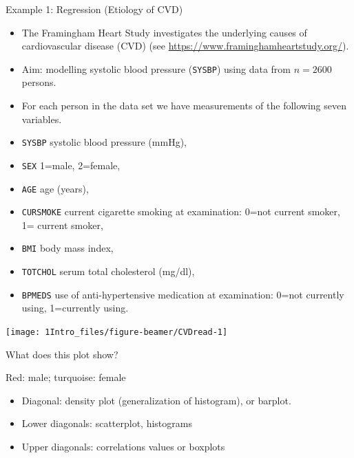 \documentclass[10pt,ignorenonframetext,]{beamer}
\providecommand{\tightlist}{%
  \setlength{\itemsep}{0pt}\setlength{\parskip}{0pt}}
\begin{document}
\begin{frame}[fragile]{Example 1: Regression (Etiology of CVD)}

\begin{itemize}
\item
  The Framingham Heart Study investigates the underlying causes of
  cardiovascular disease (CVD) (see
  \url{https://www.framinghamheartstudy.org/}). 
\item
  Aim: modelling systolic blood pressure (\texttt{SYSBP}) using data
  from \(n=2600\) persons.
\item
  For each person in the data set we have measurements of the following
  seven variables.
\end{itemize}

\scriptsize

\begin{itemize}
\tightlist
\item
  \texttt{SYSBP} systolic blood pressure (mmHg),
\item
  \texttt{SEX} 1=male, 2=female,
\item
  \texttt{AGE} age (years),
\item
  \texttt{CURSMOKE} current cigarette smoking at examination: 0=not
  current smoker, 1= current smoker,
\item
  \texttt{BMI} body mass index,
\item
  \texttt{TOTCHOL} serum total cholesterol (mg/dl),
\item
  \texttt{BPMEDS} use of anti-hypertensive medication at examination:
  0=not currently using, 1=currently using. \normalsize
\end{itemize}

\end{frame}

\begin{frame}

\begin{center}\texttt{[image: 1Intro\_files/figure-beamer/CVDread-1]} \end{center}

What does this plot show?

Red: male; turquoise: female

\end{frame}

\begin{frame}

\begin{itemize}
\tightlist
\item
  Diagonal: density plot (generalization of histogram), or barplot.
\item
  Lower diagonals: scatterplot, histograms
\item
  Upper diagonals: correlations values or boxplots
\end{itemize}

\end{frame}
\end{document}
